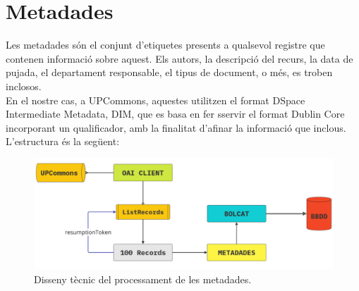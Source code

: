 \section{Metadades}\label{sec:metadata}

Les metadades són el conjunt d'etiquetes presents a qualsevol registre que contenen informació sobre aquest.
Els autors, la descripció del recurs, la data de pujada, el departament responsable, el tipus de document, o més, es troben inclosos. \\

\noindent
En el nostre cas, a \gls{UPCommons}, aquestes utilitzen el format \gls{DSpace} Intermediate Metadata, \gls{DIM}, que es basa en fer sservir el format Dublin Core incorporant un qualificador, amb la finalitat d'afinar la informació que inclous.
L'estructura és la següent:

\begin{figure}[htbp]
    \centerline{\includegraphics[width=1.2\textwidth]{figures/metadata-processing}}
    \captionsetup{justification=centering}
    \caption{Disseny tècnic del processament de les metadades.}\label{fig:log-analysis}
\end{figure}
